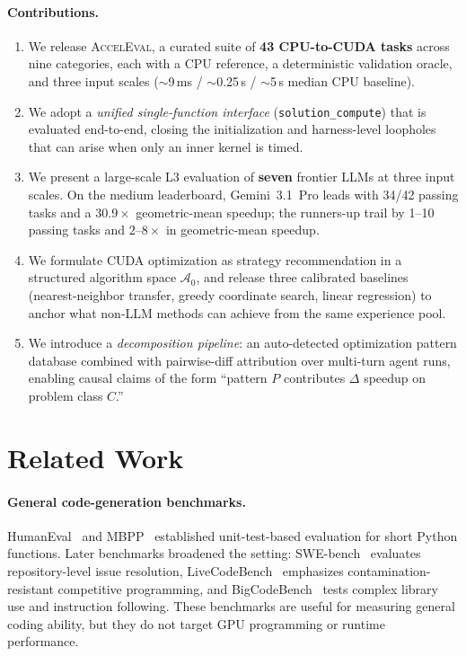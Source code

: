 \documentclass{article}
\begin{document}
\paragraph{Contributions.}
\begin{enumerate}
  \item We release \textsc{AccelEval}, a curated suite of \textbf{43 CPU-to-CUDA tasks} across nine categories, each with a CPU reference, a deterministic validation oracle, and three input scales ($\sim$9\,ms / $\sim$0.25\,s / $\sim$5\,s median CPU baseline).
  \item We adopt a \emph{unified single-function interface} (\texttt{solution\_compute}) that is evaluated end-to-end, closing the initialization and harness-level loopholes that can arise when only an inner kernel is timed.
  \item We present a large-scale L3 evaluation of \textbf{seven} frontier LLMs at three input scales. On the medium leaderboard, Gemini~3.1~Pro leads with 34/42 passing tasks and a $30.9\times$ geometric-mean speedup; the runners-up trail by 1--10 passing tasks and $2$--$8\times$ in geometric-mean speedup.
  \item We formulate CUDA optimization as strategy recommendation in a structured algorithm space $\mathcal{A}_0$, and release three calibrated baselines (nearest-neighbor transfer, greedy coordinate search, linear regression) to anchor what non-LLM methods can achieve from the same experience pool.
  \item We introduce a \emph{decomposition pipeline}: an auto-detected optimization pattern database combined with pairwise-diff attribution over multi-turn agent runs, enabling causal claims of the form ``pattern $P$ contributes $\Delta$ speedup on problem class $C$.''
\end{enumerate}



\section{Related Work}
\label{sec:related}

\paragraph{General code-generation benchmarks.}
HumanEval~\citep{humaneval} and MBPP~\citep{mbpp} established unit-test-based evaluation for short Python functions. Later benchmarks broadened the setting: SWE-bench~\citep{swebench} evaluates repository-level issue resolution, LiveCodeBench~\citep{livecodebench} emphasizes contamination-resistant competitive programming, and BigCodeBench~\citep{bigcodebench} tests complex library use and instruction following. These benchmarks are useful for measuring general coding ability, but they do not target GPU programming or runtime performance.
\end{document}
